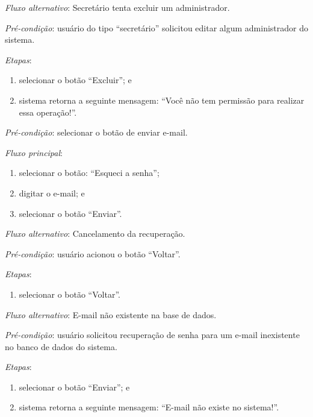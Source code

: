 \documentclass[a4paper,12pt]{article}
\begin{document}
\noindent \textit{Fluxo alternativo}: Secretário tenta excluir um administrador.

\noindent \textit{Pré-condição}: usuário do tipo ``secretário'' solicitou editar algum administrador do sistema.

\noindent \textit{Etapas}:

\begin{enumerate}
    \item selecionar o botão ``Excluir''; e
    \item sistema retorna a seguinte mensagem: ``Você não tem permissão para realizar essa operação!''.
\end{enumerate}



\vspace{0.7cm}

\noindent \textit{Pré-condição}: selecionar o botão de enviar e-mail.

\noindent \textit{Fluxo principal}:

\begin{enumerate}
    \item selecionar o botão: ``Esqueci a senha'';
    \item digitar o e-mail; e
    \item selecionar o botão ``Enviar''.
\end{enumerate}

\noindent \textit{Fluxo alternativo}: Cancelamento da recuperação.

\noindent \textit{Pré-condição}: usuário acionou o botão ``Voltar''.

\noindent \textit{Etapas}:

\begin{enumerate}
    \item selecionar o botão ``Voltar''.
\end{enumerate}


\noindent \textit{Fluxo alternativo}: E-mail não existente na base de dados.

\noindent \textit{Pré-condição}: usuário solicitou recuperação de senha para um e-mail inexistente no banco de dados do sistema.

\noindent \textit{Etapas}:

\begin{enumerate}
    \item selecionar o botão ``Enviar''; e
    \item sistema retorna a seguinte mensagem: ``E-mail não existe no sistema!''.
\end{enumerate}
\end{document}
